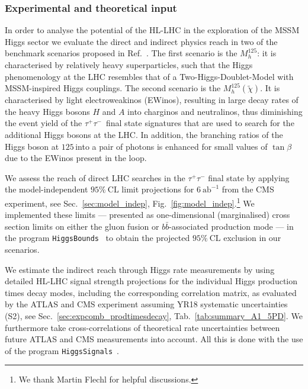 \subsubsection*{Experimental and theoretical input}

In order to analyse the potential of the HL-LHC in the exploration of the MSSM Higgs sector we evaluate the direct and indirect physics reach in two of the benchmark scenarios proposed in Ref.~\cite{Bahl:2018zmf}. The first scenario is the $M_h^{125}$: it is characterised by relatively heavy superparticles, such that the Higgs phenomenology at the LHC resembles that of a Two-Higgs-Doublet-Model with MSSM-inspired Higgs couplings. The second scenario is the $M_h^{125}(\tilde{\chi})$. It is characterised by light electroweakinos (EWinos), resulting in large decay rates of the heavy Higgs bosons $H$ and $A$ into charginos and neutralinos, thus diminishing the event yield of the $\tau^+\tau^-$~final state signatures that are used to search
for the additional Higgs bosons at the LHC. In addition, the branching ratios of the Higgs boson at $125$\,\UGeV into a pair of photons is enhanced for small values of $\tan\beta$ due to the EWinos present in the loop.

We assess the reach of direct LHC searches in the  $\tau^+\tau^-$
final state by applying the model-independent $95\%~\mathrm{CL}$
limit projections for $6~\mathrm{ab}^{-1}$ from the CMS experiment, see Sec.~\ref{sec:model_indep}, Fig.~\ref{fig:model_indep}.\footnote{We thank Martin Flechl for helpful discussions.} 
We implemented these limits --- presented as one-dimensional (marginalised) cross section limits on either the
gluon fusion or $b\bar{b}$-associated production mode --- in the program
\texttt{HiggsBounds}~\cite{Bechtle:2008jh,Bechtle:2011sb,Bechtle:2013wla,Bechtle:2015pma} to obtain the projected $95\%~\mathrm{CL}$ exclusion in our scenarios.

We estimate the indirect reach through Higgs rate measurements by
using detailed HL-LHC signal strength projections for the individual
Higgs production times decay modes, including the corresponding
correlation matrix, as evaluated by the ATLAS and CMS experiment assuming YR18 systematic uncertainties (S2), see Sec.~\ref{sec:expcomb_prodtimesdecay}, Tab.~\ref{tab:summary_A1_5PD}.  We furthermore take cross-correlations of theoretical
rate uncertainties between future ATLAS and CMS measurements into
account. All this is done with the use of the program
\texttt{HiggsSignals}~\cite{Bechtle:2013xfa}. 

